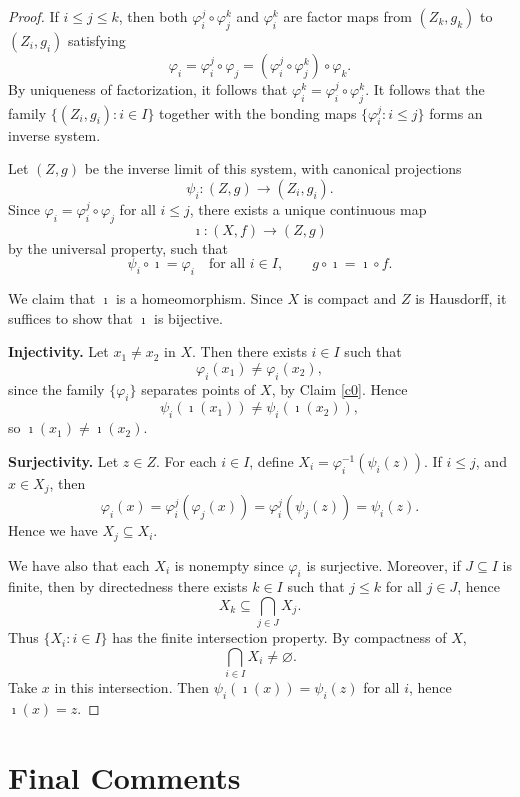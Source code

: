 \documentclass[10pt,a4paper]{amsart}
\numberwithin{equation}{section}
\begin{document}
\begin{proof}
If $i\le j\le k$, then both $\varphi_i^j\circ \varphi_j^k$ and $\varphi_i^k$ are factor maps from $(Z_k,g_k)$ to $(Z_i,g_i)$ satisfying
\[
\varphi_i
=
\varphi_i^j\circ \varphi_j
=
(\varphi_i^j\circ \varphi_j^k)\circ \varphi_k.
\]
By uniqueness of factorization, it follows that
$
\varphi_i^k=\varphi_i^j\circ \varphi_j^k.
$
It follows that the family $\{(Z_i,g_i):i\in I\}$ together with the bonding maps $\{\varphi_i^j:i\le j\}$ forms an inverse system.

Let $(Z,g)$ be the inverse limit of this system, with canonical projections
\[
\psi_i:(Z,g)\to (Z_i,g_i).
\]
Since $\varphi_i=\varphi_i^j\circ \varphi_j$ for all $i\le j$, there exists a unique continuous map
\[
\imath:(X,f)\to (Z,g)
\]
by the universal property, such that
\[
\psi_i\circ \imath=\varphi_i
\quad \text{for all } i\in I,
\qquad
g\circ \imath=\imath\circ f.
\]

We claim that $\imath$ is a homeomorphism. Since $X$ is compact and $Z$ is Hausdorff, it suffices to show that $\imath$ is bijective.

\medskip

\noindent\textbf{Injectivity.}
Let $x_1\ne x_2$ in $X$. Then there exists $i\in I$ such that
\[
\varphi_i(x_1)\ne \varphi_i(x_2),
\]
since the family $\{\varphi_i\}$ separates points of $X$, by Claim \ref{c0}. Hence
\[
\psi_i(\imath(x_1))\ne \psi_i(\imath(x_2)),
\]
so $\imath(x_1)\ne \imath(x_2)$.

\medskip

\noindent\textbf{Surjectivity.}
Let $z\in Z$. For each $i\in I$, define
$
X_i=\varphi_i^{-1}(\psi_i(z)).
$
If $i\leq j$, and $x\in X_j$, then 
\[\varphi_i(x)=\varphi^j_i(\varphi_j(x))=\varphi^j_i(\psi_j(z))=\psi_i(z).\]
Hence we have $X_j\subseteq X_i$.

We have also that each $X_i$ is nonempty since $\varphi_i$ is surjective. Moreover, if $J\subseteq I$ is finite, then by directedness there exists $k\in I$ such that $j\le k$ for all $j\in J$, hence
\[
X_k\subseteq \bigcap_{j\in J} X_j.
\]
Thus $\{X_i:i\in I\}$ has the finite intersection property. By compactness of $X$,
\[
\bigcap_{i\in I} X_i \ne \varnothing.
\]
Take $x$ in this intersection. Then $\psi_i(\imath(x))=\psi_i(z)$ for all $i$, hence $\imath(x)=z$.
\end{proof}

\section{Final Comments}\label{final}
\end{document}
